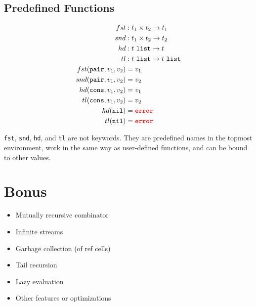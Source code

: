 \documentclass{article}
\begin{document}
\subsection{Predefined Functions}

\begin{align*}
  fst &: t_1\times t_2\to t_1 \\
  snd &: t_1\times t_2\to t_2 \\
  hd &: t\ \texttt{list}\to t \\
  tl &: t\ \texttt{list}\to t\ \texttt{list} \\
  fst(\texttt{pair},v_1,v_2) &= v_1 \\
  snd(\texttt{pair},v_1,v_2) &= v_2 \\
  hd(\texttt{cons},v_1,v_2) &= v_1 \\
  tl(\texttt{cons},v_1,v_2) &= v_2 \\
  hd(\texttt{nil}) &= \textcolor{red}{\tt error} \\
  tl(\texttt{nil}) &= \textcolor{red}{\tt error}
\end{align*}

\texttt{fst}, \texttt{snd}, \texttt{hd}, and \texttt{tl} are not keywords.
They are predefined names in the topmost environment, work in the same way as user-defined functions, and can be bound to other values.

\section{Bonus}

\begin{itemize}
  \item Mutually recursive combinator
  \item Infinite streams
  \item Garbage collection (of ref cells)
  \item Tail recursion
  \item Lazy evaluation
  \item Other features or optimizations
\end{itemize}
\end{document}
